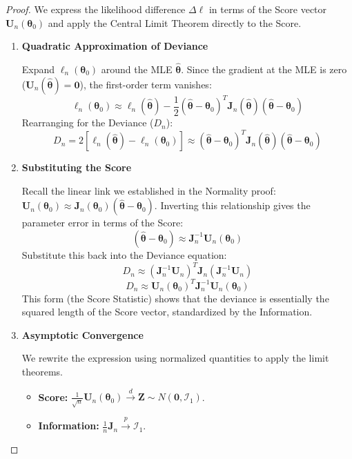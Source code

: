 \documentclass[
  letterpaper,
  DIV=11,
  numbers=noendperiod]{scrreprt}
\providecommand{\tightlist}{%
  \setlength{\itemsep}{0pt}\setlength{\parskip}{0pt}}
\renewcommand{\[}{\begin{equation}}
\renewcommand{\]}{\end{equation}}
\theoremstyle{definition}
\theoremstyle{plain}
\theoremstyle{plain}
\theoremstyle{plain}
\theoremstyle{definition}
\theoremstyle{plain}
\theoremstyle{remark}
\begin{document}
\begin{proof}
We express the likelihood difference \(\Delta \ell\) in terms of the
Score vector \(\mathbf{U}_n(\boldsymbol{\theta}_0)\) and apply the
Central Limit Theorem directly to the Score.

\begin{enumerate}
\def\labelenumi{\arabic{enumi}.}
\item
  \textbf{Quadratic Approximation of Deviance}

  Expand \(\ell_n(\boldsymbol{\theta}_0)\) around the MLE
  \(\hat{\boldsymbol{\theta}}\). Since the gradient at the MLE is zero
  (\(\mathbf{U}_n(\hat{\boldsymbol{\theta}}) = \mathbf{0}\)), the
  first-order term vanishes: \[
   \ell_n(\boldsymbol{\theta}_0) \approx \ell_n(\hat{\boldsymbol{\theta}}) - \frac{1}{2} (\hat{\boldsymbol{\theta}} - \boldsymbol{\theta}_0)^T \mathbf{J}_n(\hat{\boldsymbol{\theta}}) (\hat{\boldsymbol{\theta}} - \boldsymbol{\theta}_0)
   \] Rearranging for the Deviance (\(D_n\)): \[
   D_n = 2[\ell_n(\hat{\boldsymbol{\theta}}) - \ell_n(\boldsymbol{\theta}_0)] \approx (\hat{\boldsymbol{\theta}} - \boldsymbol{\theta}_0)^T \mathbf{J}_n(\hat{\boldsymbol{\theta}}) (\hat{\boldsymbol{\theta}} - \boldsymbol{\theta}_0)
   \]
\item
  \textbf{Substituting the Score}

  Recall the linear link we established in the Normality proof:
  \(\mathbf{U}_n(\boldsymbol{\theta}_0) \approx \mathbf{J}_n(\boldsymbol{\theta}_0)(\hat{\boldsymbol{\theta}} - \boldsymbol{\theta}_0)\).
  Inverting this relationship gives the parameter error in terms of the
  Score: \[
   (\hat{\boldsymbol{\theta}} - \boldsymbol{\theta}_0) \approx \mathbf{J}_n^{-1} \mathbf{U}_n(\boldsymbol{\theta}_0)
   \] Substitute this back into the Deviance equation: \[
   D_n \approx (\mathbf{J}_n^{-1} \mathbf{U}_n)^T \mathbf{J}_n (\mathbf{J}_n^{-1} \mathbf{U}_n)
   \] \[
   \boxed{D_n \approx \mathbf{U}_n(\boldsymbol{\theta}_0)^T \mathbf{J}_n^{-1} \mathbf{U}_n(\boldsymbol{\theta}_0)}
   \] This form (the Score Statistic) shows that the deviance is
  essentially the squared length of the Score vector, standardized by
  the Information.
\item
  \textbf{Asymptotic Convergence}

  We rewrite the expression using normalized quantities to apply the
  limit theorems.

  \begin{itemize}
  \tightlist
  \item
    \textbf{Score:}
    \(\frac{1}{\sqrt{n}} \mathbf{U}_n(\boldsymbol{\theta}_0) \xrightarrow{d} \mathbf{Z} \sim N(\mathbf{0}, \mathcal{I}_1)\).
  \item
    \textbf{Information:}
    \(\frac{1}{n} \mathbf{J}_n \xrightarrow{p} \mathcal{I}_1\).
  \end{itemize}


\end{enumerate}
\end{proof}
\end{document}
